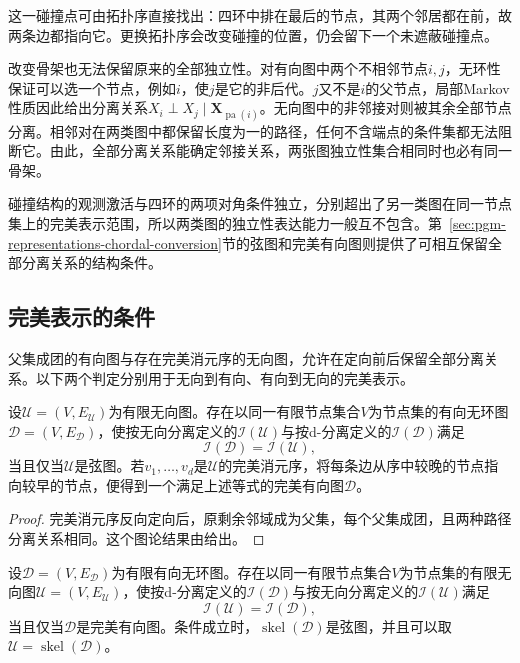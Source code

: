 这一碰撞点可由拓扑序直接找出：四环中排在最后的节点，其两个邻居都在前，故两条边都指向它。更换拓扑序会改变碰撞的位置，仍会留下一个未遮蔽碰撞点。

改变骨架也无法保留原来的全部独立性。对有向图中两个不相邻节点$i,j$，无环性保证可以选一个节点，例如$i$，使$j$是它的非后代。$j$又不是$i$的父节点，局部Markov性质因此给出分离关系$X_i\perp X_j\mid\bm{X}_{\operatorname{pa}(i)}$。无向图中的非邻接对则被其余全部节点分离。相邻对在两类图中都保留长度为一的路径，任何不含端点的条件集都无法阻断它。由此，全部分离关系能确定邻接关系，两张图独立性集合相同时也必有同一骨架。

碰撞结构的观测激活与四环的两项对角条件独立，分别超出了另一类图在同一节点集上的完美表示范围，所以两类图的独立性表达能力一般互不包含。第~\ref{sec:pgm-representations-chordal-conversion}节的弦图和完美有向图则提供了可相互保留全部分离关系的结构条件。

\subsection{完美表示的条件}
\label{sec:pgm-representations-perfect-dags}

父集成团的有向图与存在完美消元序的无向图，允许在定向前后保留全部分离关系。以下两个判定分别用于无向到有向、有向到无向的完美表示。

\begin{theorem}[无向图的完美有向图表示]
  \label{thm:pgm-representations-chordal-perfect}
  设$\mathcal{U}=(V,E_{\mathcal U})$为有限无向图。存在以同一有限节点集合$V$为节点集的有向无环图$\mathcal{D}=(V,E_{\mathcal D})$，使按无向分离定义的$\mathcal{I}(\mathcal{U})$与按d-分离定义的$\mathcal{I}(\mathcal{D})$满足
  \[
    \mathcal{I}(\mathcal{D})=\mathcal{I}(\mathcal{U}),
  \]
  当且仅当$\mathcal{U}$是弦图。若$v_1,\ldots,v_d$是$\mathcal{U}$的完美消元序，将每条边从序中较晚的节点指向较早的节点，便得到一个满足上述等式的完美有向图$\mathcal{D}$。
\end{theorem}

\begin{proof}
完美消元序反向定向后，原剩余邻域成为父集，每个父集成团，且两种路径分离关系相同。这个图论结果由给出。
\end{proof}

\begin{theorem}[有向图的完美无向图表示]
  \label{thm:pgm-representations-perfect-undirected}
  设$\mathcal{D}=(V,E_{\mathcal D})$为有限有向无环图。存在以同一有限节点集合$V$为节点集的有限无向图$\mathcal{U}=(V,E_{\mathcal U})$，使按d-分离定义的$\mathcal{I}(\mathcal{D})$与按无向分离定义的$\mathcal{I}(\mathcal{U})$满足
  \[
    \mathcal{I}(\mathcal{U})=\mathcal{I}(\mathcal{D}),
  \]
  当且仅当$\mathcal{D}$是完美有向图。条件成立时，$\operatorname{skel}(\mathcal{D})$是弦图，并且可以取$\mathcal{U}=\operatorname{skel}(\mathcal{D})$。
\end{theorem}

